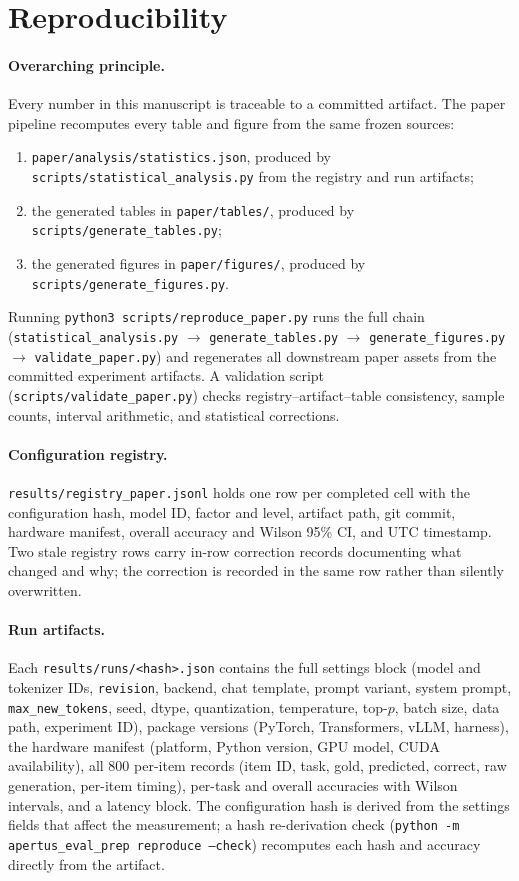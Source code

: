 \section{Reproducibility}
\label{sec:repro}

\paragraph{Overarching principle.}
Every number in this manuscript is traceable to a committed artifact. The paper pipeline recomputes every table and figure from the same frozen sources:
\begin{enumerate}
\item \texttt{paper/analysis/statistics.json}, produced by \texttt{scripts/statistical\_analysis.py} from the registry and run artifacts;
\item the generated tables in \texttt{paper/tables/}, produced by \texttt{scripts/generate\_tables.py};
\item the generated figures in \texttt{paper/figures/}, produced by \texttt{scripts/generate\_figures.py}.
\end{enumerate}
Running \texttt{python3 scripts/reproduce\_paper.py} runs the full chain
(\texttt{statistical\_analysis.py} $\to$ \texttt{generate\_tables.py}
$\to$ \texttt{generate\_figures.py} $\to$ \texttt{validate\_paper.py})
and regenerates all downstream paper assets from the committed experiment artifacts. A validation script (\texttt{scripts/validate\_paper.py}) checks registry--artifact--table consistency, sample counts, interval arithmetic, and statistical corrections.

\paragraph{Configuration registry.}
\texttt{results/registry\_paper.jsonl} holds one row per completed cell with the configuration hash, model ID, factor and level, artifact path, git commit, hardware manifest, overall accuracy and Wilson 95\% CI, and UTC timestamp. Two stale registry rows carry in-row correction records documenting what changed and why; the correction is recorded in the same row rather than silently overwritten.

\paragraph{Run artifacts.}
Each \texttt{results/runs/<hash>.json} contains the full settings block (model and tokenizer IDs, \texttt{revision}, backend, chat template, prompt variant, system prompt, \texttt{max\_new\_tokens}, seed, dtype, quantization, temperature, top-$p$, batch size, data path, experiment ID), package versions (PyTorch, Transformers, vLLM, harness), the hardware manifest (platform, Python version, GPU model, CUDA availability), all 800 per-item records (item ID, task, gold, predicted, correct, raw generation, per-item timing), per-task and overall accuracies with Wilson intervals, and a latency block. The configuration hash is derived from the settings fields that affect the measurement; a hash re-derivation check (\texttt{python -m apertus\_eval\_prep reproduce --check}) recomputes each hash and accuracy directly from the artifact.

